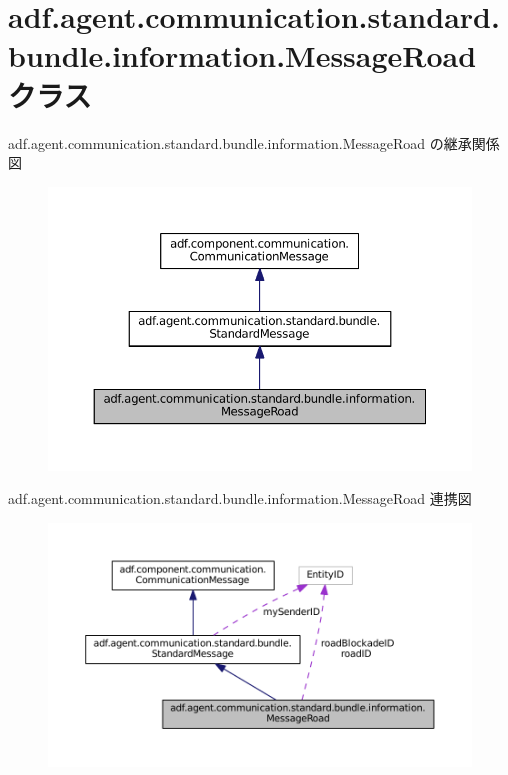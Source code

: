 \hypertarget{classadf_1_1agent_1_1communication_1_1standard_1_1bundle_1_1information_1_1MessageRoad}{}\section{adf.\+agent.\+communication.\+standard.\+bundle.\+information.\+Message\+Road クラス}
\label{classadf_1_1agent_1_1communication_1_1standard_1_1bundle_1_1information_1_1MessageRoad}


adf.\+agent.\+communication.\+standard.\+bundle.\+information.\+Message\+Road の継承関係図
\nopagebreak
\begin{figure}[H]
\begin{center}
\leavevmode
\includegraphics[width=350pt]{classadf_1_1agent_1_1communication_1_1standard_1_1bundle_1_1information_1_1MessageRoad__inherit__graph}
\end{center}
\end{figure}


adf.\+agent.\+communication.\+standard.\+bundle.\+information.\+Message\+Road 連携図
\nopagebreak
\begin{figure}[H]
\begin{center}
\leavevmode
\includegraphics[width=350pt]{classadf_1_1agent_1_1communication_1_1standard_1_1bundle_1_1information_1_1MessageRoad__coll__graph}
\end{center}
\end{figure}
